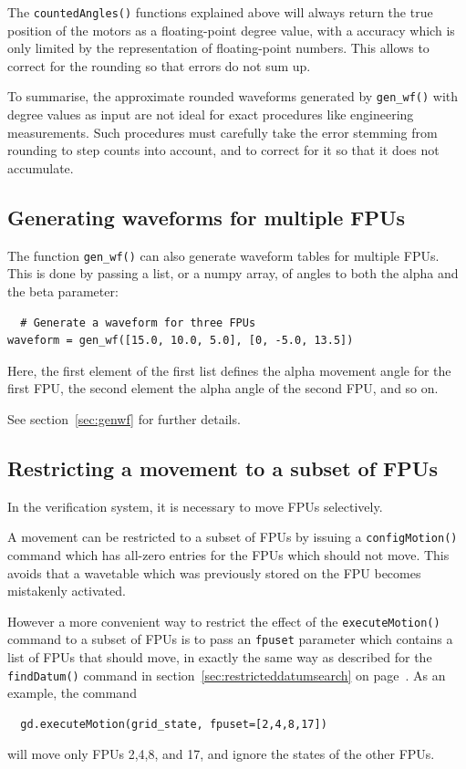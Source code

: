 \documentclass[fontsize=12,a4paper]{scrreprt}
\begin{document}
The \texttt{countedAngles()} functions explained above will always
return the true position of the motors as a floating-point degree
value, with a accuracy which is only limited by the representation of
floating-point numbers. This allows to correct for the rounding so
that errors do not sum up.

To summarise, the approximate rounded waveforms generated by
\texttt{gen\_wf()} with degree values as input are not ideal for exact
procedures like engineering measurements. Such procedures must
carefully take the error stemming from rounding to step counts into
account, and to correct for it so that it does not accumulate.

\subsection{Generating waveforms for multiple FPUs}
The function \texttt{gen\_wf()} can also generate waveform tables for
multiple FPUs. This is done by passing a list, or a numpy array,
of angles to both the alpha and the beta parameter:

\begin{verbatim}
  # Generate a waveform for three FPUs
waveform = gen_wf([15.0, 10.0, 5.0], [0, -5.0, 13.5])
\end{verbatim}

Here, the first element of the first list
defines the alpha movement angle for the
first FPU, the second element the alpha
angle of the second FPU, and so on.

See section~\ref{sec:genwf} for further details.

\subsection{Restricting a movement to a subset of FPUs}
  In the verification system, it is necessary
to move FPUs selectively.

A movement can be restricted to a subset of FPUs by issuing a
\texttt{configMotion()} command which has all-zero entries for the FPUs
which should not move. This avoids that a wavetable which was
previously stored on the FPU becomes mistakenly activated.

However a more convenient way to restrict the effect
of the \texttt{executeMotion()} command to a
subset of FPUs is to pass an \texttt{fpuset} parameter
which contains a list of FPUs that should move,
in exactly the same way as described for the \texttt{findDatum()}
command in section~\ref{sec:restricteddatumsearch}
on page~\pageref{sec:restricteddatumsearch}. As an example,
the command
\begin{verbatim}
  gd.executeMotion(grid_state, fpuset=[2,4,8,17])
\end{verbatim}
will move only FPUs 2,4,8, and 17, and ignore the states of the other
FPUs.
\end{document}
